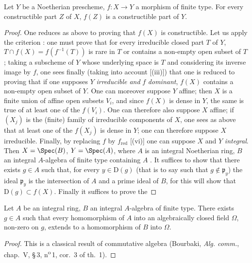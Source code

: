 
\begin{corollary}[1.8.5]
\label{IV.1.8.5}
Let $Y$ be a Noetherian prescheme, $f:X\to Y$ a morphism of finite type.
For every constructible part $Z$ of $X$, $f(Z)$ is a constructible part of $Y$.
\end{corollary}

\begin{proof}
One reduces as above to proving that $f(X)$ is constructible.
Let us apply the criterion : one must prove that for every irreducible closed part $T$ of $Y$, $T\cap f(X)=f(f^{-1}(T))$ is rare in $T$ or contains a non-empty open subset of $T$; taking a subscheme of $Y$ whose underlying space is $T$  and considering its inverse image by $f$, one sees finally (taking into account [(iii)]) that one is reduced to proving that if one supposes $Y$ \emph{irreducible and} $f$ \emph{dominant}, $f(X)$ contains a non-empty open subset of $Y$.
One can moreover suppose $Y$ affine; then $X$ is a finite union of affine open subsets $V_i$, and since $f(X)$ is dense in $Y$, the same is true of at least one of the $f(V_i)$.
One can therefore also suppose $X$ affine; if $(X_j)$ is the (finite) family of irreducible components of $X$, one sees as above that at least one of the $f(X_j)$ is dense in $Y$; one can therefore suppose $X$ irreducible.
Finally, by replacing $f$ by $f_{\mathrm{red}}$ [(vi)] one can suppose $X$ and $Y$ \emph{integral}.
Then $X=\Spec(B)$, $Y=\Spec(A)$, where $A$ is an integral Noetherian ring, $B$ an integral $A$-algebra of finite type containing $A$ .
It suffices to show that there exists $g\in A$ such that, for every $y\in\mathrm{D}(g)$ (that is to say such that $g\notin\mathfrak{p}_y$) the ideal $\mathfrak{p}_y$ is the intersection of $A$ and a prime ideal of $B$, for this will show that $\mathrm{D}(g)\subset f(X)$.
Finally it suffices to prove the
\end{proof}

\begin{lemma}[1.8.5.1]
\label{IV.1.8.5.1}
Let $A$ be an integral ring, $B$ an integral $A$-algebra of finite type.
There exists $g\in A$ such that every homomorphism of $A$ into an algebraically closed field $\Omega$, non-zero on $g$, extends to a homomorphism of $B$ into $\Omega$.
\end{lemma}

\begin{proof}
This is a classical result of commutative algebra (Bourbaki, \emph{Alg. comm.}, chap.~V, \S\,3, n\textsuperscript{o}\,1, cor.~3 of th.~1).
\end{proof}


